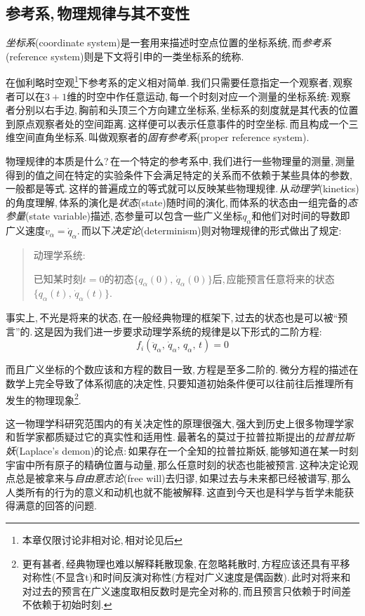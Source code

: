 \subsection{参考系,\,物理规律与其不变性}

\emph{坐标系}(coordinate system)是一套用来描述时空点位置的坐标系统,\,而\emph{参考系}(reference system)则是下文将引申的一类坐标系的统称.

在伽利略时空观\footnote{本章仅限讨论非相对论,\,相对论见后}下参考系的定义相对简单.\,我们只需要任意指定一个观察者,\,观察者可以在$3+1$维的时空中作任意运动,\,每一个时刻对应一个测量的坐标系统:\,观察者分别以右手边,\,胸前和头顶三个方向建立坐标系,\,坐标系的刻度就是其代表的位置到原点观察者处的空间距离.\,这样便可以表示任意事件的时空坐标.\,而且构成一个三维空间直角坐标系.\,叫做观察者的\emph{固有参考系}(proper reference system).

物理规律的本质是什么?\,在一个特定的参考系中,\,我们进行一些物理量的测量,\,测量得到的值之间在特定的实验条件下会满足特定的关系而不依赖于某些具体的参数,\,一般都是等式.\,这样的普遍成立的等式就可以反映某些物理规律.\,从\emph{动理学}(kinetics)的角度理解,\,体系的演化是\emph{状态}(state)随时间的演化,\,而体系的状态由一组完备的\emph{态参量}(state variable)描述,\,态参量可以包含一些广义坐标$q_\alpha$和他们对时间的导数即广义速度$v_\alpha=\dot{q}_\alpha$.\,而以下\emph{决定论}(determinism)则对物理规律的形式做出了规定:
\begin{quote}
动理学系统:

已知某时刻$t=0$的初态$\{q_\alpha(0),\,\dot{q}_\alpha(0)\}$后,\,应能预言任意将来的状态$\{q_\alpha(t),\,\dot{q}_\alpha(t)\}$.
\end{quote}

事实上,\,不光是将来的状态,\,在一般经典物理的框架下,\,过去的状态也是可以被``预言''的.\,这是因为我们进一步要求动理学系统的规律是以下形式的二阶方程:
\[f_i(\ddot{q}_\alpha,\,\dot{q}_\alpha,\,{q}_\alpha,\,t)=0\]

而且广义坐标的个数应该和方程的数目一致,\,方程是至多二阶的.\,微分方程的描述在数学上完全导致了体系彻底的决定性,\,只要知道初始条件便可以往前往后推理所有发生的物理现象\footnote{更有甚者,\,经典物理也难以解释耗散现象,\,在忽略耗散时,\,方程应该还具有平移对称性(不显含t)和时间反演对称性(方程对广义速度是偶函数).\,此时对将来和对过去的预言在广义速度取相反数时是完全对称的,\,而且预言只依赖于时间差不依赖于初始时刻.}.

这一物理学科研究范围内的有关决定性的原理很强大,\,强大到历史上很多物理学家和哲学家都质疑过它的真实性和适用性.\,最著名的莫过于拉普拉斯提出的\emph{拉普拉斯妖}(Laplace's demon)的论点:\,如果存在一个全知的拉普拉斯妖,\,能够知道在某一时刻宇宙中所有原子的精确位置与动量,\,那么任意时刻的状态也能被预言.\,这种决定论观点总是被拿来与\emph{自由意志论}(free will)去归谬,\,如果过去与未来都已经被谱写,\,那么人类所有的行为的意义和动机也就不能被解释.\,这直到今天也是科学与哲学未能获得满意的回答的问题.

